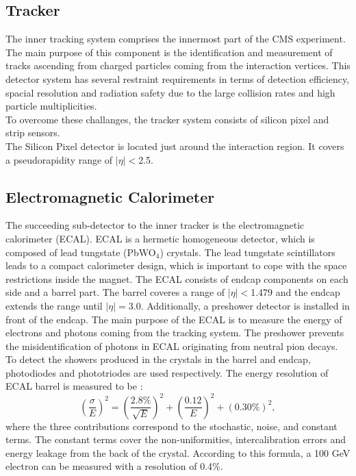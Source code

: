 \subsection{Tracker}
The inner tracking system comprises the innermost part of the CMS experiment. The main purpose of this component is the identification and measurement of tracks ascending from charged particles coming from the interaction vertices. This detector system has several restraint requirements in terms of detection efficiency, spacial resolution and radiation safety due to the large collision rates and high particle multiplicities.\\
To overcome these challanges, the tracker system consists of silicon pixel and strip sensors.\\
The Silicon Pixel detector is located just around the interaction region. It covers a pseudorapidity range of $|\eta|$$<$2.5.
\subsection{Electromagnetic Calorimeter}
The succeeding sub-detector to the inner tracker is the electromagnetic calorimeter (ECAL). ECAL is a hermetic homogeneous detector, which is composed of lead tungstate (PbWO$_4$) crystals. The lead tungstate scintillators leads to a compact calorimeter design, which is important to cope with the space restrictions inside the magnet. The ECAL consists of endcap components on each side and a barrel part. The barrel coveres a range of $|\eta|<$1.479 and the endcap extends the range until $|\eta|$$=$3.0. Additionally, a preshower detector is installed in front of the endcap. The main purpose of the ECAL is to measure the energy of electrons and photons coming from the tracking system. The preshower prevents the misidentification of photons in ECAL originating from neutral pion decays. To detect the showers produced in the crystals in the barrel and endcap, photodiodes and phototriodes are used respectively.
The energy resolution of ECAL barrel is measured to be \cite{ECAL_res}:
\begin{equation}
  \label{eqn:EcalRes}
   (\frac{\sigma}{E})^2 = (\frac{2.8\%}{\sqrt{E}})^2+(\frac{0.12}{E})^2+(0.30\%)^2 ,
\end{equation}
where the three contributions correspond to the stochastic, noise, and constant terms. The constant terms cover the non-uniformities, intercalibration errors and energy leakage from the back of the crystal. According to this formula, a 100 GeV electron can be measured with a resolution of 0.4\%.
